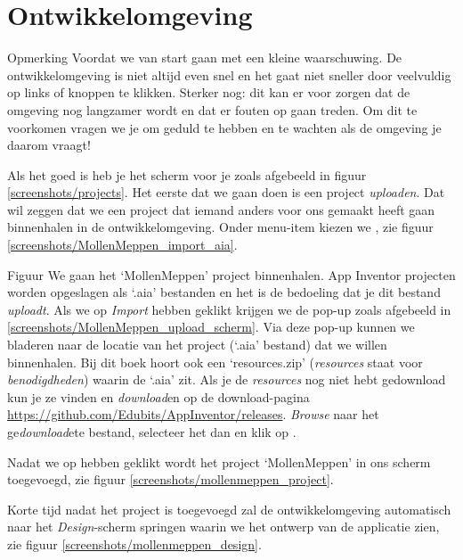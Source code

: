 \chapter{Ontwikkelomgeving}
\label{chap:ontwikkelomgeving}

\begin{derivation}{Opmerking}
Voordat we van start gaan met \ai een kleine waarschuwing. De ontwikkelomgeving is niet altijd even snel en het gaat niet sneller door veelvuldig op links of knoppen te klikken. Sterker nog: dit kan er voor zorgen dat de omgeving nog langzamer wordt en dat er fouten op gaan treden. Om dit te voorkomen vragen we je om geduld te hebben en te wachten als de omgeving je daarom vraagt!
\end{derivation}

Als het goed is heb je het scherm voor je zoals afgebeeld in figuur \ref{screenshots/projects}. Het eerste dat we gaan doen is een project \emph{uploaden}. Dat wil zeggen dat we een project dat iemand anders voor ons gemaakt heeft gaan binnenhalen in de  ontwikkelomgeving. Onder menu-item  kiezen we , zie figuur \ref{screenshots/MollenMeppen_import_aia}.

Figuur 
We gaan het `MollenMeppen' project binnenhalen. App Inventor projecten worden opgeslagen als `.aia' bestanden en het is de bedoeling dat je dit bestand \emph{uploadt}. Als we op \emph{Import} hebben geklikt krijgen we de pop-up zoals afgebeeld in \ref{screenshots/MollenMeppen_upload_scherm}. 
Via deze pop-up kunnen we bladeren naar de locatie van het project (`.aia' bestand) dat we willen binnenhalen. Bij dit boek hoort ook een `resources.zip' (\emph{resources} staat voor \emph{benodigdheden}) waarin de `.aia' zit. Als je de \emph{resources} nog niet hebt gedownload kun je ze vinden en \emph{download}en op de download-pagina \url{https://github.com/Edubits/AppInventor/releases}.
\emph{Browse} naar het ge\emph{download}ete bestand, selecteer het dan en klik op .
 
Nadat  we op  hebben geklikt wordt het project `MollenMeppen' in ons scherm toegevoegd, zie figuur \ref{screenshots/mollenmeppen_project}.


Korte tijd nadat het project is toegevoegd zal de ontwikkelomgeving automatisch naar het \emph{Design}-scherm springen waarin we het ontwerp van de applicatie zien, zie figuur \ref{screenshots/mollenmeppen_design}. 

